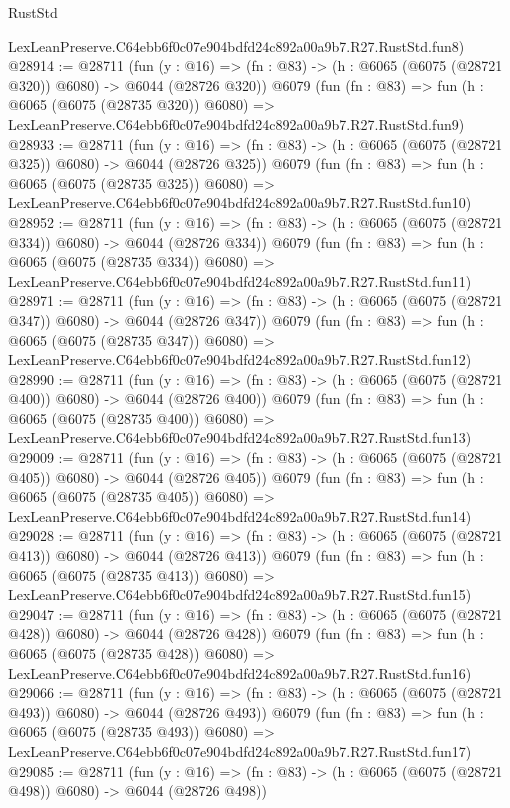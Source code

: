 \begin{lexlean}{RustStd}
\begin{coremodule}
    LexLeanPreserve.C64ebb6f0c07e904bdfd24c892a00a9b7.R27.RustStd.fun8)
@28914 := @28711
    (fun (y : @16) => (fn : @83) -> (h : @6065 (@6075 (@28721 @320)) @6080) -> @6044 (@28726 @320))
    @6079
    (fun (fn : @83) =>
    fun (h : @6065 (@6075 (@28735 @320)) @6080) =>
    LexLeanPreserve.C64ebb6f0c07e904bdfd24c892a00a9b7.R27.RustStd.fun9)
@28933 := @28711
    (fun (y : @16) => (fn : @83) -> (h : @6065 (@6075 (@28721 @325)) @6080) -> @6044 (@28726 @325))
    @6079
    (fun (fn : @83) =>
    fun (h : @6065 (@6075 (@28735 @325)) @6080) =>
    LexLeanPreserve.C64ebb6f0c07e904bdfd24c892a00a9b7.R27.RustStd.fun10)
@28952 := @28711
    (fun (y : @16) => (fn : @83) -> (h : @6065 (@6075 (@28721 @334)) @6080) -> @6044 (@28726 @334))
    @6079
    (fun (fn : @83) =>
    fun (h : @6065 (@6075 (@28735 @334)) @6080) =>
    LexLeanPreserve.C64ebb6f0c07e904bdfd24c892a00a9b7.R27.RustStd.fun11)
@28971 := @28711
    (fun (y : @16) => (fn : @83) -> (h : @6065 (@6075 (@28721 @347)) @6080) -> @6044 (@28726 @347))
    @6079
    (fun (fn : @83) =>
    fun (h : @6065 (@6075 (@28735 @347)) @6080) =>
    LexLeanPreserve.C64ebb6f0c07e904bdfd24c892a00a9b7.R27.RustStd.fun12)
@28990 := @28711
    (fun (y : @16) => (fn : @83) -> (h : @6065 (@6075 (@28721 @400)) @6080) -> @6044 (@28726 @400))
    @6079
    (fun (fn : @83) =>
    fun (h : @6065 (@6075 (@28735 @400)) @6080) =>
    LexLeanPreserve.C64ebb6f0c07e904bdfd24c892a00a9b7.R27.RustStd.fun13)
@29009 := @28711
    (fun (y : @16) => (fn : @83) -> (h : @6065 (@6075 (@28721 @405)) @6080) -> @6044 (@28726 @405))
    @6079
    (fun (fn : @83) =>
    fun (h : @6065 (@6075 (@28735 @405)) @6080) =>
    LexLeanPreserve.C64ebb6f0c07e904bdfd24c892a00a9b7.R27.RustStd.fun14)
@29028 := @28711
    (fun (y : @16) => (fn : @83) -> (h : @6065 (@6075 (@28721 @413)) @6080) -> @6044 (@28726 @413))
    @6079
    (fun (fn : @83) =>
    fun (h : @6065 (@6075 (@28735 @413)) @6080) =>
    LexLeanPreserve.C64ebb6f0c07e904bdfd24c892a00a9b7.R27.RustStd.fun15)
@29047 := @28711
    (fun (y : @16) => (fn : @83) -> (h : @6065 (@6075 (@28721 @428)) @6080) -> @6044 (@28726 @428))
    @6079
    (fun (fn : @83) =>
    fun (h : @6065 (@6075 (@28735 @428)) @6080) =>
    LexLeanPreserve.C64ebb6f0c07e904bdfd24c892a00a9b7.R27.RustStd.fun16)
@29066 := @28711
    (fun (y : @16) => (fn : @83) -> (h : @6065 (@6075 (@28721 @493)) @6080) -> @6044 (@28726 @493))
    @6079
    (fun (fn : @83) =>
    fun (h : @6065 (@6075 (@28735 @493)) @6080) =>
    LexLeanPreserve.C64ebb6f0c07e904bdfd24c892a00a9b7.R27.RustStd.fun17)
@29085 := @28711
    (fun (y : @16) => (fn : @83) -> (h : @6065 (@6075 (@28721 @498)) @6080) -> @6044 (@28726 @498))

\end{coremodule}
\end{lexlean}
